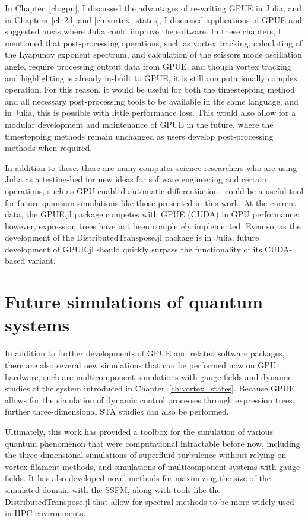 In Chapter~\ref{ch:gpu}, I discussed the advantages of re-writing GPUE in Julia, and in Chapters~\ref{ch:2d} and \ref{ch:vortex_states}, I discussed applications of GPUE and suggested areas where Julia could improve the software.
In these chapters, I mentioned that post-processing operations, such as vortex tracking, calculating of the Lyapunov exponent spectrum, and calculation of the scissors mode oscillation angle, require processing output data from GPUE, and though vortex tracking and highlighting is already in-built to GPUE, it is still computationally complex operation.
For this reason, it would be useful for both the timestepping method and all necessary post-processing tools to be available in the same language, and in Julia, this is possible with little performance loss.
This would also allow for a modular development and maintenance of GPUE in the future, where the timestepping methods remain unchanged as users develop post-processing methods when required.

In addition to these, there are many computer science researchers who are using Julia as a testing-bed for new ideas for software engineering and certain operations, such as GPU-enabled automatic differentiation~\cite{revels2018} could be a useful tool for future quantum simulations like those presented in this work.
At the current data, the GPUE.jl package competes with GPUE (CUDA) in GPU performance; however, expression trees have not been completely implemented.
Even so, as the development of the DistributedTranspose.jl package is in Julia, future development of GPUE.jl should quickly surpass the functionality of its CUDA-based variant.

\section{Future simulations of quantum systems}

In addition to further developments of GPUE and related software packages, there are also several new simulations that can be performed now on GPU hardware, such are multicomponent simulations with gauge fields and dynamic studies of the system introduced in Chapter~\ref{ch:vortex_states}.
Because GPUE allows for the simulation of dynamic control processes through expression trees, further three-dimensional STA studies can also be performed.

Ultimately, this work has provided a toolbox for the simulation of various quantum phenomenon that were computational intractable before now, including the three-dimensional simulations of superfluid turbulence without relying on vortex-filament methods, and simulations of multicomponent systems with gauge fields.
It has also developed novel methods for maximizing the size of the simulated domain with the SSFM, along with tools like the DistributedTranspose.jl that allow for spectral methods to be more widely used in HPC environments.

